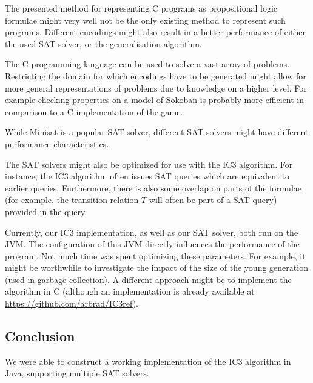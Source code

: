 \documentclass[a4paper]{article}
\begin{document}
The presented method for representing C programs as propositional logic formulae might very well not be the only existing method to represent such programs. Different encodings might also result in a better performance of either the used SAT solver, or the generalisation algorithm.

The C programming language can be used to solve a vast array of problems. %
Restricting the domain for which encodings have to be generated might allow for more general representations of problems due to knowledge on a higher level. For example checking properties on a model of Sokoban is probably more efficient in comparison to a C implementation of the game.

While Minisat is a popular SAT solver, different SAT solvers might have different performance characteristics.

The SAT solvers might also be optimized for use with the IC3 algorithm. For instance, the IC3 algorithm often issues SAT queries which are equivalent to earlier queries. Furthermore, there is also some overlap on parts of the formulae (for example, the transition relation $T$ will often be part of a SAT query) provided in the query.

Currently, our IC3 implementation, as well as our SAT solver, both run on the JVM. The configuration of this JVM directly influences the performance of the program. Not much time was spent optimizing these parameters. For example, it might be worthwhile to investigate the impact of the size of the young generation (used in garbage collection). A different approach might be to implement the algorithm in C (although an implementation is already available at \url{https://github.com/arbrad/IC3ref}).


\subsection{Conclusion}
We were able to construct a working implementation of the IC3 algorithm in Java, supporting multiple SAT solvers.



\end{document}
